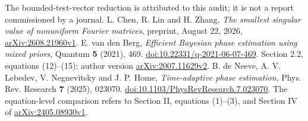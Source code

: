 \documentclass[11pt]{amsart}
\theoremstyle{definition}\newtheorem{definition}[theorem]{Definition}
\theoremstyle{remark}\newtheorem{remark}[theorem]{Remark}
\begin{document}
{The bounded-test-vector reduction is attributed to this audit;
it is not a report commissioned by a journal.
L. Chen, R. Lin and H. Zhang,
\emph{The smallest singular value of nonuniform Fourier matrices},
preprint, August 22, 2026,
\href{https://arxiv.org/abs/2608.21960v1}{arXiv:2608.21960v1}.
E. van den Berg, \emph{Efficient Bayesian phase estimation using mixed
priors}, Quantum \textbf{5} (2021), 469.
\href{https://doi.org/10.22331/q-2021-06-07-469}{doi:10.22331/q-2021-06-07-469}.
Section 2.2, equations (12)--(15); author version
\href{https://arxiv.org/abs/2007.11629v2}{arXiv:2007.11629v2}.
B. de Neeve, A. V. Lebedev, V. Negnevitsky and J. P. Home,
\emph{Time-adaptive phase estimation}, Phys. Rev. Research
\textbf{7} (2025), 023070.
\href{https://doi.org/10.1103/PhysRevResearch.7.023070}{doi:10.1103/PhysRevResearch.7.023070}.
The equation-level comparison refers to Section II, equations (1)--(3),
and Section IV of \href{https://arxiv.org/html/2405.08930v1}{arXiv:2405.08930v1}.

\VnineEndBibliography}
\end{document}
